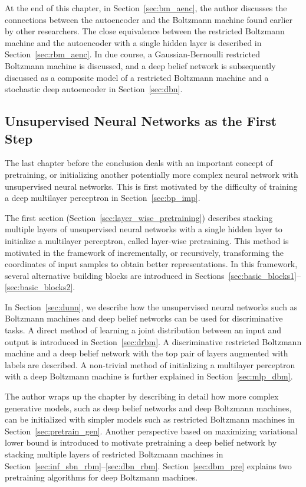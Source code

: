 \documentclass{now}
\newcommand{\alert}[1]{\textcolor{red}{#1}}
\newcommand{\citepub}[1]{\alert{#1}}
\begin{document}
At the end of this chapter, in Section~\ref{sec:bm_aenc}, the author discusses
the connections between the autoencoder and the Boltzmann machine found earlier
by other researchers. The close equivalence between the restricted Boltzmann
machine and the autoencoder with a single hidden layer is described in
Section~\ref{sec:rbm_aenc}. In due course, a Gaussian-Bernoulli restricted
Boltzmann machine is discussed, and
a deep belief network is subsequently discussed as a composite model of a
restricted Boltzmann machine and a stochastic deep autoencoder in
Section~\ref{sec:dbn}.


\subsection{Unsupervised Neural Networks as the First Step}

The last chapter before the conclusion deals with an important concept of
pretraining, or initializing another potentially more complex neural network
with unsupervised neural networks. This is first motivated by the difficulty of
training a deep multilayer perceptron in Section~\ref{sec:bp_imp}.

The first section (Section~\ref{sec:layer_wise_pretraining}) describes stacking
multiple layers of unsupervised neural networks with a single hidden layer to
initialize a multilayer perceptron, called layer-wise pretraining. This method
is motivated in the framework of incrementally, or recursively, transforming
the coordinates of input samples to obtain better representations. In this
framework, several alternative building blocks are introduced in
Sections~\ref{sec:basic_blocks1}--\ref{sec:basic_blocks2}.

In Section~\ref{sec:dunn}, we describe how the unsupervised neural networks
such as Boltzmann machines and deep belief networks can be used for
discriminative tasks. A direct method of learning a joint distribution between
an input and output is introduced in Section~\ref{sec:drbm}. A discriminative
restricted Boltzmann machine and a deep belief network with the top pair of
layers augmented with labels are described. A non-trivial method of
initializing a multilayer perceptron with a deep Boltzmann machine is further
explained in Section~\ref{sec:mlp_dbm}.

The author wraps up the chapter by describing in detail how more complex
generative models, such as deep belief networks and deep Boltzmann machines,
can be initialized with simpler models such as restricted Boltzmann machines in
Section~\ref{sec:pretrain_gen}. Another perspective based on maximizing
variational lower bound is introduced to motivate pretraining a deep belief
network by stacking multiple layers of restricted Boltzmann machines in
Section~\ref{sec:inf_sbn_rbm}--\ref{sec:dbn_rbm}.  Section~\ref{sec:dbm_pre}
explains two pretraining algorithms for deep Boltzmann machines. 
\end{document}
